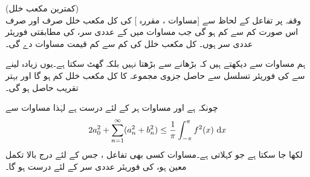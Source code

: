 \quad (کمترین مکعب خلل)\\
وقفہ  پر تفاعل  کے لحاظ سے  [مساوات ، مقررہ ] کی کل مکعب خلل صرف اور صرف اس صورت کم سے کم ہو گی جب مساوات  میں  کے عددی سر،  کی  مطابقتی فوریئر عددی سر ہوں۔ کل مکعب خلل کی کم سے کم قیمت مساوات  دے گی۔

ہم مساوات  سے دیکھتے ہیں کہ  بڑھانے سے  بڑھتا نہیں بلکہ گھٹ سکتا ہے۔یوں زیادہ  لینے سے   کی فوریئر تسلسل سے حاصل جزوی مجموعہ کا کل مکعب خلل کم ہو گا اور بہتر تقریب حاصل ہو گی۔

چونکہ  ہے  اور مساوات  ہر  کے لئے درست ہے لہٰذا مساوات  سے 
\begin{align}\label{مساوات_فوریئر_بیسل_غیر_مساوات}
2a_0^2+\sum\limits_{n=1}^{\infty} (a_n^2+b_n^2)\le \frac{1}{\pi}\int_{-\pi}^{\pi} f^2(x)\,\dif x
\end{align}
لکھا جا سکتا ہے جو  کہلاتی ہے۔مساوات  کسی بھی تفاعل ، جس کے لئے درج بالا تکمل معین ہو، کی فوریئر عددی سر کے لئے درست ہو گا۔


